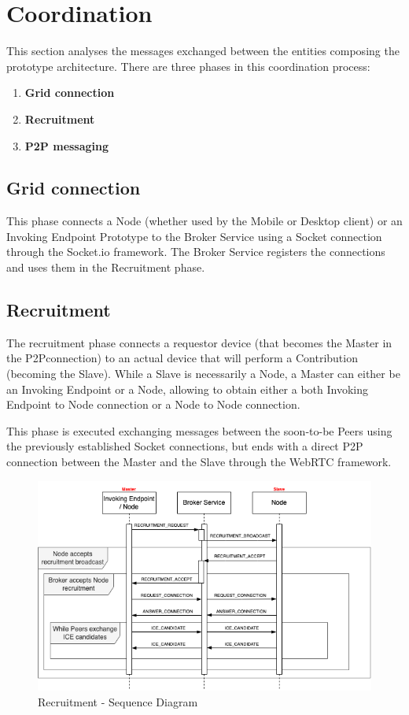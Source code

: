 \section{Coordination}\label{coordination}
This section analyses the messages exchanged between the entities composing the prototype architecture. There are three phases in this coordination process:
\begin{enumerate}
    \item \textbf{Grid connection}
    \item \textbf{Recruitment}
    \item \textbf{P2P messaging}
\end{enumerate}

\subsection{Grid connection}
This phase connects a Node (whether used by the Mobile or Desktop client) or an Invoking Endpoint Prototype to the Broker Service using a Socket connection through the Socket.io framework. The Broker Service registers the connections and uses them in the Recruitment phase.

\subsection{Recruitment}
The recruitment phase connects a requestor device (that becomes the Master in the P2Pconnection) to an actual device that will perform a Contribution (becoming the Slave). While a Slave is necessarily a Node, a Master can either be an Invoking Endpoint or a Node, allowing to obtain either a both Invoking Endpoint to Node connection or a Node to Node connection.

This phase is executed exchanging messages between the soon-to-be Peers using the previously established Socket connections, but ends with a direct P2P connection between the Master and the Slave through the WebRTC framework.

\vspace{4mm}

\begin{figure}[!ht]
    \centering
    \includegraphics[width=\linewidth]{document/chapters/chapter_7/images/recruitment_messages.png}
    \caption{Recruitment - Sequence Diagram}
    \label{fig:recruitment_messages}
\end{figure}

